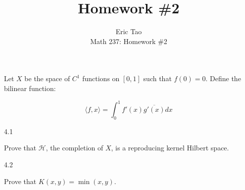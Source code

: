 \documentclass[10pt]{article}
\newenvironment{problem}[2][]{\begin{trivlist}
\item[\hskip \labelsep {\bfseries #1}\hskip \labelsep {\bfseries #2.}]}{\end{trivlist}}
\begin{document}
 
\title{Homework \#2}
\author{Eric Tao\\
Math 237: Homework \#2}
\maketitle

\begin{problem}{Question 4}

Let $X$ be the space of $C^1$ functions on $[0,1]$ such that $f(0) = 0$. Define the bilinear function:

$$\langle f, x \rangle = \int_0^1 f'(x) \overline{g'(x)} dx$$

4.1

Prove that $\mathcal{H}$, the completion of $X$, is a reproducing kernel Hilbert space.

4.2

Prove that $K(x,y) = \min(x,y)$.

\end{problem}
\end{document}
